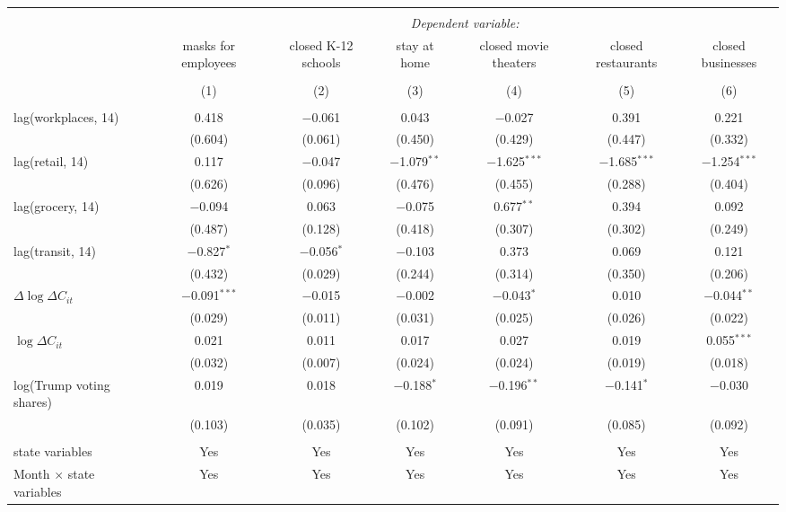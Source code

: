 \begin{tabular}{@{\extracolsep{1pt}}lcccccc} 
\\[-1.8ex]\hline 
\hline \\[-1.8ex] 
 & \multicolumn{6}{c}{\textit{Dependent variable:}} \\ 
\cline{2-7} 
 & masks for employees & closed K-12 schools & stay at home & closed movie theaters & closed restaurants & closed businesses \\ 
\\[-1.8ex] & (1) & (2) & (3) & (4) & (5) & (6)\\ 
\hline \\[-1.8ex] 
 lag(workplaces, 14) & 0.418 & $-$0.061 & 0.043 & $-$0.027 & 0.391 & 0.221 \\ 
  & (0.604) & (0.061) & (0.450) & (0.429) & (0.447) & (0.332) \\ 
  lag(retail, 14) & 0.117 & $-$0.047 & $-$1.079$^{**}$ & $-$1.625$^{***}$ & $-$1.685$^{***}$ & $-$1.254$^{***}$ \\ 
  & (0.626) & (0.096) & (0.476) & (0.455) & (0.288) & (0.404) \\ 
  lag(grocery, 14) & $-$0.094 & 0.063 & $-$0.075 & 0.677$^{**}$ & 0.394 & 0.092 \\ 
  & (0.487) & (0.128) & (0.418) & (0.307) & (0.302) & (0.249) \\ 
  lag(transit, 14) & $-$0.827$^{*}$ & $-$0.056$^{*}$ & $-$0.103 & 0.373 & 0.069 & 0.121 \\ 
  & (0.432) & (0.029) & (0.244) & (0.314) & (0.350) & (0.206) \\ 
  $\Delta \log \Delta C_{it}$ & $-$0.091$^{***}$ & $-$0.015 & $-$0.002 & $-$0.043$^{*}$ & 0.010 & $-$0.044$^{**}$ \\ 
  & (0.029) & (0.011) & (0.031) & (0.025) & (0.026) & (0.022) \\ 
  $\log \Delta C_{it}$ & 0.021 & 0.011 & 0.017 & 0.027 & 0.019 & 0.055$^{***}$ \\ 
  & (0.032) & (0.007) & (0.024) & (0.024) & (0.019) & (0.018) \\ 
  log(Trump voting shares) & 0.019 & 0.018 & $-$0.188$^{*}$ & $-$0.196$^{**}$ & $-$0.141$^{*}$ & $-$0.030 \\ 
  & (0.103) & (0.035) & (0.102) & (0.091) & (0.085) & (0.092) \\ 
 \hline \\[-1.8ex] 
state variables & Yes & Yes & Yes & Yes & Yes & Yes \\ 
Month $\times$ state variables & Yes & Yes & Yes & Yes & Yes & Yes \\ 

\end{tabular}
